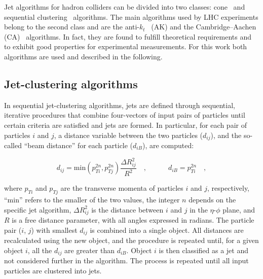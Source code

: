 Jet algorithms for hadron colliders can be divided into two classes: cone~\cite{Salam:2007xv} and sequential clustering~\cite{Catani:1993hr,Ellis:1993tq,Dokshitzer:1997in,Wobisch:1998wt,Cacciari:2008gp} algorithms.
The main algorithms used by LHC experiments belong to the second class and are the anti-$k_t$~\cite{Cacciari:2008gp} (AK) and the Cambridge--Aachen (CA)~\cite{Catani:1993hr,Dokshitzer:1997in} algorithms. In fact, they are found to fulfill theoretical requirements and to exhibit good properties for experimental measurements. For this work both algorithms are used and described in the following.
 
\subsection{Jet-clustering algorithms}\label{subsec:jetsalgo}

In sequential jet-clustering algorithms, jets are defined through sequential, iterative procedures that combine four-vectors of input pairs of particles until certain criteria are satisfied and jets are formed. In particular, for each pair of particles $i$ and $j$, a distance variable between the two particles ($d_{ij}$), and the so-called ``beam distance'' for each particle ($d_{iB}$), are computed:
 
\begin{equation}\label{eqn:jetalgo}
d_{ij} = \mathrm{min}(p_{Ti}^{2n},p_{Tj}^{2n})\frac{\Delta R^2_{ij}}{R^2}\quad,\quad\quad\quad
d_{iB} = p_{Ti}^{2n}\quad,
\end{equation} 

\noindent where $p_{Ti}$ and $p_{Tj}$ are the transverse momenta of particles $i$ and $j$, respectively, ``min'' refers to the smaller of the two \pt values, the integer $n$ depends on the specific jet algorithm, $\Delta R^2_{ij}$ is the distance between $i$ and $j$ in the $\eta$-$\phi$ plane, and $R$ is a free distance parameter, with all angles expressed in radians. The particle pair ($i$, $j$) with smallest $d_{ij}$ is combined into a single object. All distances are recalculated using the new object, and the procedure is repeated until, for a given object $i$, all the $d_{ij}$ are greater than $d_{iB}$. Object $i$ is then classified as a jet and not considered further in the algorithm. The process is repeated until all input particles are clustered into jets.

